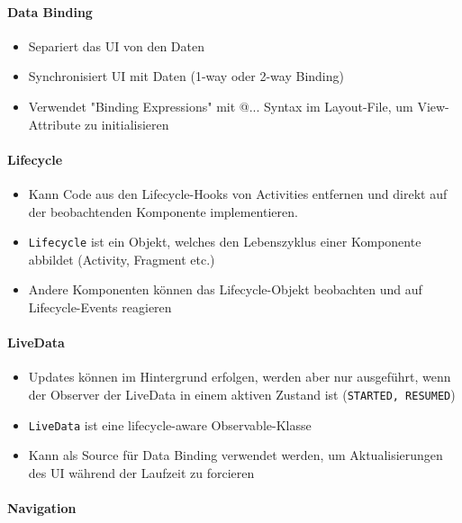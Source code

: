 \documentclass[a4paper]{article}
\begin{document}
				\paragraph{Data Binding}
				
				\begin{itemize}
					\item Separiert das UI von den Daten
					\item Synchronisiert UI mit Daten (1-way oder 2-way Binding)
					\item Verwendet "Binding Expressions" mit @{...} Syntax im Layout-File, um View-Attribute zu initialisieren
				\end{itemize}
			
				\paragraph{Lifecycle}
				
				\begin{itemize}
					\item Kann Code aus den Lifecycle-Hooks von Activities entfernen und direkt auf der beobachtenden Komponente implementieren.
					\item \texttt{Lifecycle} ist ein Objekt, welches den Lebenszyklus einer Komponente abbildet (Activity, Fragment etc.)
					\item Andere Komponenten können das Lifecycle-Objekt beobachten und auf Lifecycle-Events reagieren
				\end{itemize}
			
				\paragraph{LiveData}
				
				\begin{itemize}
					\item Updates können im Hintergrund erfolgen, werden aber nur ausgeführt, wenn der Observer der LiveData in einem aktiven Zustand ist (\texttt{STARTED, RESUMED})
					\item \texttt{LiveData} ist eine lifecycle-aware Observable-Klasse
					\item Kann als Source für Data Binding verwendet werden, um Aktualisierungen des UI während der Laufzeit zu forcieren
				\end{itemize}
			
				\paragraph{Navigation}
				
\end{document}
